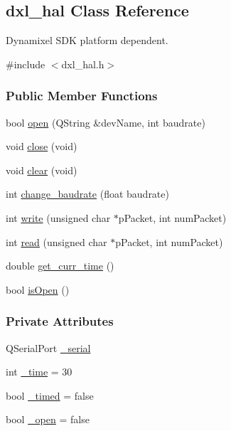 \hypertarget{a00003}{}\subsection{dxl\+\_\+hal Class Reference}
\label{a00003}


Dynamixel S\+D\+K platform dependent.  




{\ttfamily \#include $<$dxl\+\_\+hal.\+h$>$}

\subsubsection*{Public Member Functions}
\begin{DoxyCompactItemize}
\item 
bool \hyperlink{a00003_ab631c2a5533125f14db9a8ec1c33aa7c}{open} (Q\+String \&dev\+Name, int baudrate)
\item 
void \hyperlink{a00003_a250fd7e4acabf54d0733551a13e89a2d}{close} (void)
\item 
void \hyperlink{a00003_a004eedde5af69219d7288ec8ea97c89f}{clear} (void)
\item 
int \hyperlink{a00003_a0eaaa5340bc9dce73cc920dc8befe5b0}{change\+\_\+baudrate} (float baudrate)
\item 
int \hyperlink{a00003_a90106970438fb0ab65852730a1c0776a}{write} (unsigned char $\ast$p\+Packet, int num\+Packet)
\item 
int \hyperlink{a00003_ac36331febb2eaa66303af3483795742a}{read} (unsigned char $\ast$p\+Packet, int num\+Packet)
\item 
double \hyperlink{a00003_a6b6b7381c45308662fc3df6e7f74bc61}{get\+\_\+curr\+\_\+time} ()
\item 
bool \hyperlink{a00003_a88bba601b5c9f285fcdc14e18a1f3398}{is\+Open} ()
\end{DoxyCompactItemize}
\subsubsection*{Private Attributes}
\begin{DoxyCompactItemize}
\item 
Q\+Serial\+Port \hyperlink{a00003_a785d0e35b81d779b54869cad668f9745}{\+\_\+serial}
\item 
int \hyperlink{a00003_ae3d8733b5ca778b070218765ca0746ac}{\+\_\+time} = 30
\item 
bool \hyperlink{a00003_a10d474daa3ca42b5c5ceb6558a955ca1}{\+\_\+timed} = false
\item 
bool \hyperlink{a00003_a04831154c43fe4f7499ea0950e0f0999}{\+\_\+open} = false
\end{DoxyCompactItemize}


